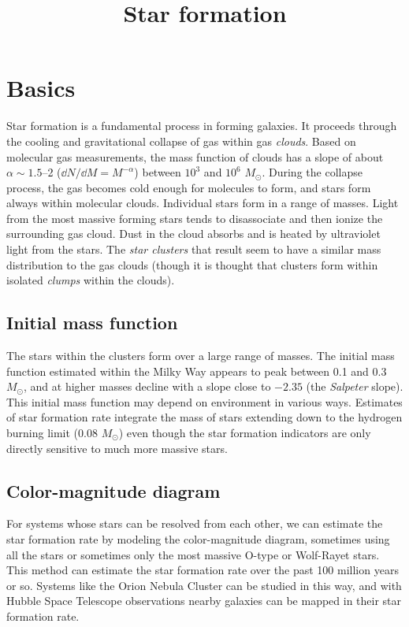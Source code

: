 \title{\bf Star formation}

\section{Basics}

Star formation is a fundamental process in forming galaxies. It
proceeds through the cooling and gravitational collapse of gas within
gas {\it clouds}. Based on molecular gas measurements, the mass
function of clouds has a slope of about $\alpha\sim 1.5$--2
($\dd{N}/\dd{M} = M^{-\alpha}$) between $10^3$ and $10^6$ $M_\odot$.
During the collapse process, the gas becomes cold enough for molecules
to form, and stars form always within molecular clouds. Individual
stars form in a range of masses. Light from the most massive forming
stars tends to disassociate and then ionize the surrounding gas
cloud. Dust in the cloud absorbs and is heated by ultraviolet light
from the stars. The {\it star clusters} that result seem to have a
similar mass distribution to the gas clouds (though it is thought that
clusters form within isolated {\it clumps} within the clouds).

\subsection{Initial mass function}

The stars within the clusters form over a large range of masses. The
initial mass function estimated within the Milky Way appears to peak
between 0.1 and 0.3 $M_\odot$, and at higher masses decline with a
slope close to $-2.35$ (the {\it Salpeter} slope). This initial mass
function may depend on environment in various ways.  Estimates of star
formation rate integrate the mass of stars extending down to the
hydrogen burning limit ($0.08$ $M_\odot$) even though the star
formation indicators are only directly sensitive to much more massive
stars.

\subsection{Color-magnitude diagram}

For systems whose stars can be resolved from each other, we can
estimate the star formation rate by modeling the color-magnitude
diagram, sometimes using all the stars or sometimes only the most
massive O-type or Wolf-Rayet stars. This method can estimate the star
formation rate over the past 100 million years or so. Systems like the
Orion Nebula Cluster can be studied in this way, and with Hubble
Space Telescope observations nearby galaxies can be mapped in their
star formation rate.

